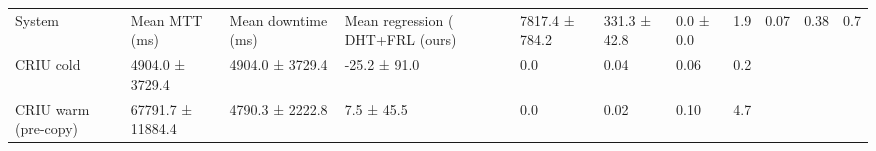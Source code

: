 \begin{tabular}{llllllll}
\toprule
System & Mean MTT (ms) & Mean downtime (ms) & Mean regression (%
\midrule
DHT+FRL (ours) & 7817.4 ± 784.2 & 331.3 ± 42.8 & 0.0 ± 0.0 & 1.9 & 0.07 & 0.38 & 0.7 \\
CRIU cold & 4904.0 ± 3729.4 & 4904.0 ± 3729.4 & -25.2 ± 91.0 & 0.0 & 0.04 & 0.06 & 0.2 \\
CRIU warm (pre-copy) & 67791.7 ± 11884.4 & 4790.3 ± 2222.8 & 7.5 ± 45.5 & 0.0 & 0.02 & 0.10 & 4.7 \\
\bottomrule
\end{tabular}
